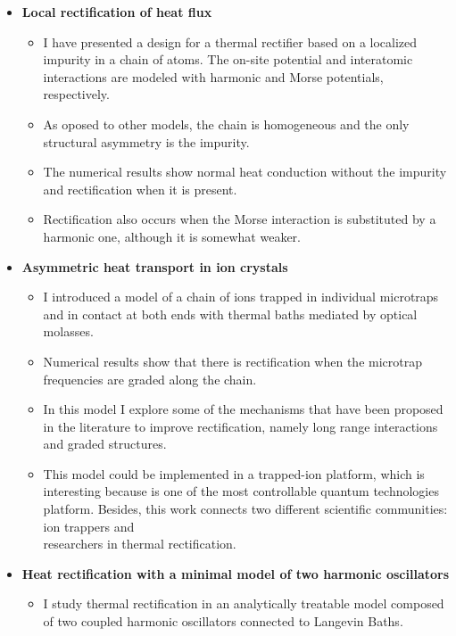 \begin{itemize}
  \item {\bf Local rectification of heat flux}
  \begin{itemize}
    \item I have presented a design for a thermal rectifier based on a localized impurity in a chain of atoms. The on-site potential and interatomic interactions are modeled with harmonic and Morse potentials, respectively.

    \item As oposed to other models, the chain is homogeneous and the only structural asymmetry is the impurity.

    \item The numerical results show normal heat conduction without the impurity and rectification when it is present.

    \item Rectification also occurs when the Morse interaction is substituted by a harmonic one, although it is somewhat weaker.

  \end{itemize}

  \item {\bf Asymmetric heat transport in ion crystals}
  \begin{itemize}
    \item I introduced a model of a chain of ions trapped in individual microtraps and in contact at both ends with thermal baths mediated by optical molasses.

    \item Numerical results show that there is rectification when the microtrap frequencies are graded along the chain.

    \item In this model I explore some of the mechanisms that have been proposed in the literature to improve rectification, namely long range interactions and graded structures.

    \item This model could be implemented in a trapped-ion platform, which is interesting because is one of the most controllable quantum technologies platform. Besides, this work connects two different scientific communities: ion trappers and\\
    researchers in thermal rectification.
  \end{itemize}

  \item {\bf Heat rectification with a minimal model of two harmonic oscillators}
  \begin{itemize}
    \item  I study thermal rectification in an analytically treatable model
    composed of two coupled harmonic oscillators connected to Langevin Baths.


\end{itemize}
\end{itemize}
